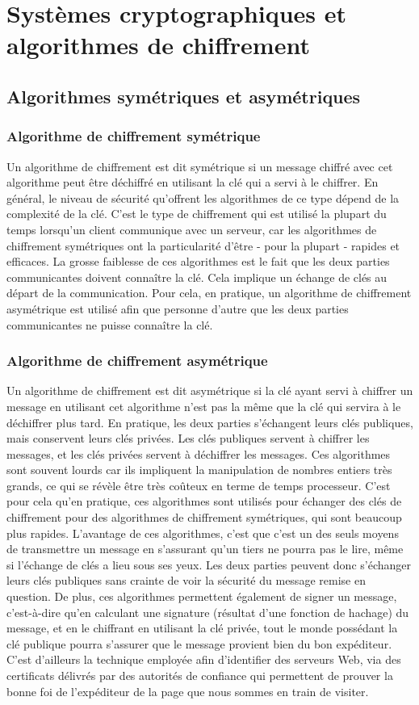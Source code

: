 \chapter{Systèmes cryptographiques et algorithmes de chiffrement}
	\section{Algorithmes symétriques et asymétriques}
		\subsection{Algorithme de chiffrement symétrique}
			Un algorithme de chiffrement est dit symétrique si un message chiffré avec cet algorithme peut être déchiffré en utilisant la clé qui a servi à le chiffrer. En général, le niveau de sécurité qu'offrent les algorithmes de ce type dépend de la complexité de la clé. C'est le type de chiffrement qui est utilisé la plupart du temps lorsqu'un client communique avec un serveur, car les algorithmes de chiffrement symétriques ont la particularité d'être - pour la plupart - rapides et efficaces. La grosse faiblesse de ces algorithmes est le fait que les deux parties communicantes doivent connaître la clé. Cela implique un échange de clés au départ de la communication. Pour cela, en pratique, un algorithme de chiffrement asymétrique est utilisé afin que personne d'autre que les deux parties communicantes ne puisse connaître la clé.
		\subsection{Algorithme de chiffrement asymétrique}
			Un algorithme de chiffrement est dit asymétrique si la clé ayant servi à chiffrer un message en utilisant cet algorithme n'est pas la même que la clé qui servira à le déchiffrer plus tard. En pratique, les deux parties s'échangent leurs clés publiques, mais conservent leurs clés privées. Les clés publiques servent à chiffrer les messages, et les clés privées servent à déchiffrer les messages. Ces algorithmes sont souvent lourds car ils impliquent la manipulation de nombres entiers très grands, ce qui se révèle être très coûteux en terme de temps processeur. C'est pour cela qu'en pratique, ces algorithmes sont utilisés pour échanger des clés de chiffrement pour des algorithmes de chiffrement symétriques, qui sont beaucoup plus rapides. L'avantage de ces algorithmes, c'est que c'est un des seuls moyens de transmettre un message en s'assurant qu'un tiers ne pourra pas le lire, même si l'échange de clés a lieu sous ses yeux. Les deux parties peuvent donc s'échanger leurs clés publiques sans crainte de voir la sécurité du message remise en question. De plus, ces algorithmes permettent également de signer un message, c'est-à-dire qu'en calculant une signature (résultat d'une fonction de hachage) du message, et en le chiffrant en utilisant la clé privée, tout le monde possédant la clé publique pourra s'assurer que le message provient bien du bon expéditeur. C'est d'ailleurs la technique employée afin d'identifier des serveurs Web, via des certificats délivrés par des autorités de confiance qui permettent de prouver la bonne foi de l'expéditeur de la page que nous sommes en train de visiter.
